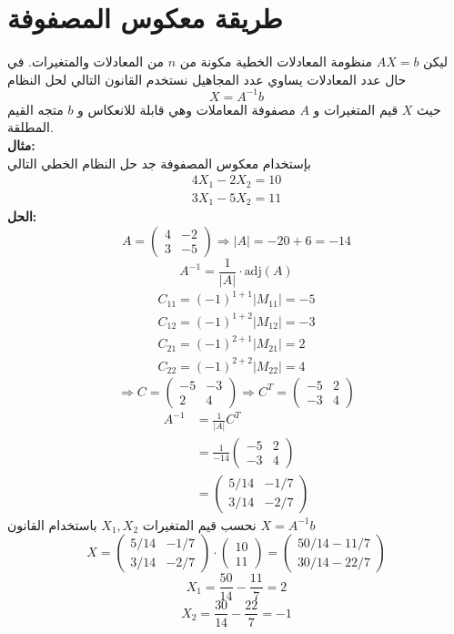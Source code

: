 \section[طريقة معكوس المصفوفة]{طريقة معكوس المصفوفة}
ليكن $AX=b$ منظومة المعادلات الخطية مكونة من $n$ من المعادلات والمتغيرات. في حال عدد المعادلات يساوي عدد المجاهيل نستخدم القانون التالي لحل النظام
\[
X = A^{-1}b
\]
حيث $X$ قيم المتغيرات و $A$ مصفوفة المعاملات وهي قابلة للانعكاس و $b$ متجه القيم المطلقة.\\
\noindent\textbf{مثال:}\\ \noindent
بإستخدام معكوس المصفوفة جد حل النظام الخطي التالي
\begin{align*}
	4X_1 - 2X_2 = 10\\
	3X_1 - 5X_2 = 11
\end{align*}
\noindent\textbf{الحل:}\\ \noindent
\[
A = 
\begin{pmatrix}
	4&-2\\
	3&-5
\end{pmatrix}
\Rightarrow |A| = -20+6=-14
\]
\[
A^{-1} = \frac{1}{|A|}\cdot \text{adj}(A)
\]
\begin{align*}
	C_{11} = (-1)^{1+1} |M_{11}| = -5\\
	C_{12} = (-1)^{1+2} |M_{12}| = -3\\
	C_{21} = (-1)^{2+1} |M_{21}| = 2\\
	C_{22} = (-1)^{2+2} |M_{22}| = 4
\end{align*}
\[
\Rightarrow C =
\begin{pmatrix}
	-5& -3\\
	2&4
\end{pmatrix}
\Rightarrow C^T
=\begin{pmatrix}
	-5&2\\
	-3&4
\end{pmatrix}
\]
\begin{align*}
	A^{-1} &= \frac{1}{|A|}C^T\\
	&=\frac{1}{-14} 
	\begin{pmatrix}
		-5&2\\
		-3&4
	\end{pmatrix}\\
	&=
	\begin{pmatrix}
		5/14 & -1/7\\
		3/14 & -2/7
	\end{pmatrix}
\end{align*}
نحسب قيم المتغيرات $X_1, X_2 $ باستخدام القانون $X=A^{-1}b$
\[
X = 
\begin{pmatrix}
	5/14 & -1/7\\
	3/14 & -2/7
\end{pmatrix} \cdot
\begin{pmatrix}
	10\\11
\end{pmatrix}=
\begin{pmatrix}
	50/14 - 11/7\\
	30/14 - 22/7
\end{pmatrix}
\]
\[
X_1 = \frac{50}{14} - \frac{11}{7} = 2
\]
\[
X_2 = \frac{30}{14} - \frac{22}{7} = -1
\]

